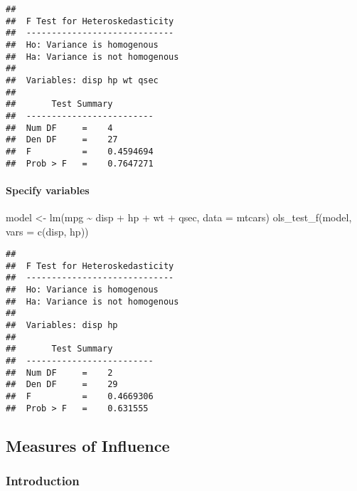 \documentclass[
]{article}
\newenvironment{Shaded}{\begin{snugshade}}{\end{snugshade}}
\newcommand{\AttributeTok}[1]{\textcolor[rgb]{0.77,0.63,0.00}{#1}}
\newcommand{\FunctionTok}[1]{\textcolor[rgb]{0.00,0.00,0.00}{#1}}
\newcommand{\NormalTok}[1]{#1}
\newcommand{\OtherTok}[1]{\textcolor[rgb]{0.56,0.35,0.01}{#1}}
\newcommand{\SpecialCharTok}[1]{\textcolor[rgb]{0.00,0.00,0.00}{#1}}
\newcommand{\StringTok}[1]{\textcolor[rgb]{0.31,0.60,0.02}{#1}}
\begin{document}
\begin{verbatim}
## 
##  F Test for Heteroskedasticity
##  -----------------------------
##  Ho: Variance is homogenous
##  Ha: Variance is not homogenous
## 
##  Variables: disp hp wt qsec 
## 
##       Test Summary        
##  -------------------------
##  Num DF     =    4 
##  Den DF     =    27 
##  F          =    0.4594694 
##  Prob > F   =    0.7647271
\end{verbatim}

\hypertarget{specify-variables-1}{%
\paragraph{Specify variables}\label{specify-variables-1}}

\begin{Shaded}
\begin{Highlighting}[]
\NormalTok{model }\OtherTok{\textless{}{-}} \FunctionTok{lm}\NormalTok{(mpg }\SpecialCharTok{\textasciitilde{}}\NormalTok{ disp }\SpecialCharTok{+}\NormalTok{ hp }\SpecialCharTok{+}\NormalTok{ wt }\SpecialCharTok{+}\NormalTok{ qsec, }\AttributeTok{data =}\NormalTok{ mtcars)}
\FunctionTok{ols\_test\_f}\NormalTok{(model, }\AttributeTok{vars =} \FunctionTok{c}\NormalTok{(}\StringTok{\textquotesingle{}disp\textquotesingle{}}\NormalTok{, }\StringTok{\textquotesingle{}hp\textquotesingle{}}\NormalTok{))}
\end{Highlighting}
\end{Shaded}

\begin{verbatim}
## 
##  F Test for Heteroskedasticity
##  -----------------------------
##  Ho: Variance is homogenous
##  Ha: Variance is not homogenous
## 
##  Variables: disp hp 
## 
##       Test Summary        
##  -------------------------
##  Num DF     =    2 
##  Den DF     =    29 
##  F          =    0.4669306 
##  Prob > F   =    0.631555
\end{verbatim}

\hypertarget{measures-of-influence}{%
\subsection{Measures of Influence}\label{measures-of-influence}}

\hypertarget{introduction-3}{%
\subsubsection{Introduction}\label{introduction-3}}
\end{document}
